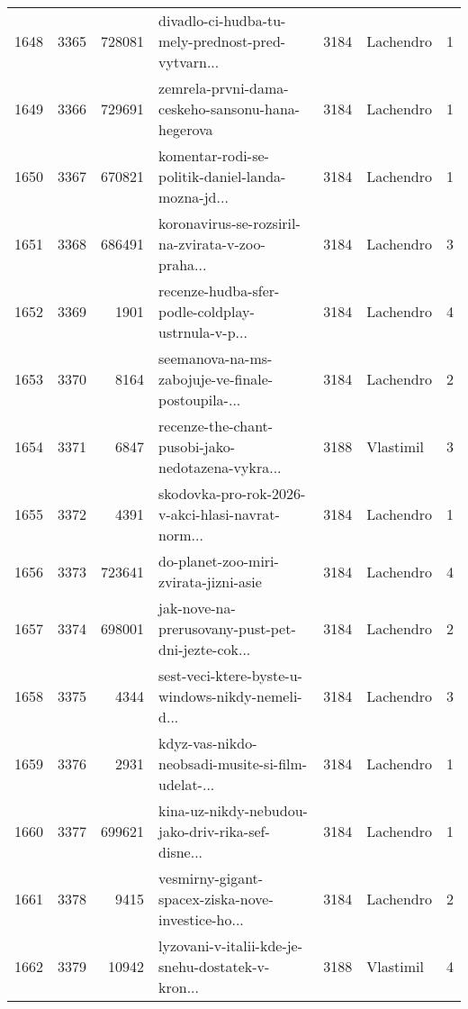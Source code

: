 \begin{tabular}{lrrlrlr}
1648 &       3365 &   728081 &  divadlo-ci-hudba-tu-mely-prednost-pred-vytvarn... &     3184 &                    Lachendro &               1 \\
1649 &       3366 &   729691 &   zemrela-prvni-dama-ceskeho-sansonu-hana-hegerova &     3184 &                    Lachendro &               1 \\
1650 &       3367 &   670821 &  komentar-rodi-se-politik-daniel-landa-mozna-jd... &     3184 &                    Lachendro &               1 \\
1651 &       3368 &   686491 &  koronavirus-se-rozsiril-na-zvirata-v-zoo-praha... &     3184 &                    Lachendro &               3 \\
1652 &       3369 &     1901 &  recenze-hudba-sfer-podle-coldplay-ustrnula-v-p... &     3184 &                    Lachendro &               4 \\
1653 &       3370 &     8164 &  seemanova-na-ms-zabojuje-ve-finale-postoupila-... &     3184 &                    Lachendro &               2 \\
1654 &       3371 &     6847 &  recenze-the-chant-pusobi-jako-nedotazena-vykra... &     3188 &                    Vlastimil &               3 \\
1655 &       3372 &     4391 &  skodovka-pro-rok-2026-v-akci-hlasi-navrat-norm... &     3184 &                    Lachendro &               1 \\
1656 &       3373 &   723641 &              do-planet-zoo-miri-zvirata-jizni-asie &     3184 &                    Lachendro &               4 \\
1657 &       3374 &   698001 &  jak-nove-na-prerusovany-pust-pet-dni-jezte-cok... &     3184 &                    Lachendro &               2 \\
1658 &       3375 &     4344 &  sest-veci-ktere-byste-u-windows-nikdy-nemeli-d... &     3184 &                    Lachendro &               3 \\
1659 &       3376 &     2931 &  kdyz-vas-nikdo-neobsadi-musite-si-film-udelat-... &     3184 &                    Lachendro &               1 \\
1660 &       3377 &   699621 &  kina-uz-nikdy-nebudou-jako-driv-rika-sef-disne... &     3184 &                    Lachendro &               1 \\
1661 &       3378 &     9415 &  vesmirny-gigant-spacex-ziska-nove-investice-ho... &     3184 &                    Lachendro &               2 \\
1662 &       3379 &    10942 &  lyzovani-v-italii-kde-je-snehu-dostatek-v-kron... &     3188 &                    Vlastimil &               4 \\

\end{tabular}
